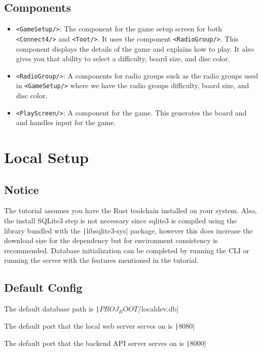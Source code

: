 \documentclass{article}
\begin{document}
\subsection{Components}
\begin{itemize}
  \item \texttt{<GameSetup/>}: The component for the game setup screen for both  \texttt{<Connect4/>} and \texttt{<Toot/>}. It uses the component \texttt{<RadioGroup/>}. This component displays the details of the game and explains how to play. It also gives you that ability to select a difficulty, board size, and disc color. 
  \item \texttt{<RadioGroup/>}: A components for radio groups such as the radio groups used in \texttt{<GameSetup/>} where we have the radio groups difficulty, board size, and disc color. 
  \item \texttt{<PlayScreen/>}: A component for the game. This generates the board and and handles input for the game.
\end{itemize}

\section{Local Setup}

\subsection{Notice}
The tutorial assumes you have the Rust toolchain installed on your system.
Also, the install SQLite3 step is not necessary since sqlite3 is compiled using the library bundled with the \texttt|libsqlite3-sys| package,
however this does increase the download size for the dependency but for environment consistency is recommended.
Database initialization can be completed by running the CLI or running the server with the features mentioned in the tutorial.

\subsection{Default Config}

The default database path is \texttt|$PROJ_ROOT$/localdev.db|

The default port that the local web server serves on is \texttt|8080|

The default port that the backend API server serves on is \texttt|8000|
\end{document}
